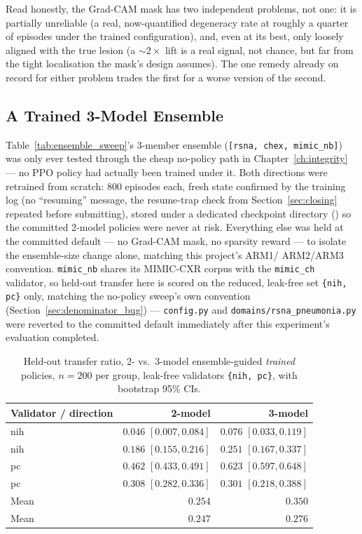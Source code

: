 Read honestly, the Grad-CAM mask has two independent problems, not one:
it is partially unreliable (a real, now-quantified degeneracy rate at
roughly a quarter of episodes under the trained configuration), and, even
at its best, only loosely aligned with the true lesion (a $\sim2\times$
lift is a real signal, not chance, but far from the tight localisation the
mask's design assumes). The one remedy already on record for either
problem trades the first for a worse version of the second.

\subsection{A Trained 3-Model Ensemble}
\label{sec:ensemble3}

Table~\ref{tab:ensemble_sweep}'s 3-member ensemble
(\texttt{[rsna, chex, mimic\_nb]}) was only ever tested through the cheap
no-policy path in Chapter~\ref{ch:integrity} --- no PPO policy had
actually been trained under it. Both directions were retrained from
scratch: 800 episodes each, fresh state confirmed by the training log
(no ``resuming'' message, the resume-trap check from
Section~\ref{sec:closing} repeated before submitting), stored under a
dedicated checkpoint directory () so the
committed 2-model policies were never at risk. Everything else was held
at the committed default --- no Grad-CAM mask, no sparsity reward --- to
isolate the ensemble-size change alone, matching this project's ARM1/
ARM2/ARM3 convention. \texttt{mimic\_nb} shares its MIMIC-CXR corpus with
the \texttt{mimic\_ch} validator, so held-out transfer here is scored on
the reduced, leak-free set \texttt{\{nih, pc\}} only, matching the
no-policy sweep's own convention (Section~\ref{sec:denominator_bug}) ---
\texttt{config.py} and \texttt{domains/rsna\_pneumonia.py} were reverted
to the committed default immediately after this experiment's evaluation
completed.

\begin{table}[h]
\centering
\caption{Held-out transfer ratio, 2- vs.\ 3-model ensemble-guided
\emph{trained} policies, $n=200$ per group, leak-free validators
\texttt{\{nih, pc\}}, with bootstrap 95\% CIs.}
\label{tab:ensemble3_transfer}
\begin{tabular}{@{}lrr@{}}
\toprule
\textbf{Validator / direction} & \textbf{2-model} & \textbf{3-model} \\
\midrule
nih \ntop{} & $0.046$ $[0.007,0.084]$ & $0.076$ $[0.033,0.119]$ \\
nih \pton{} & $0.186$ $[0.155,0.216]$ & $0.251$ $[0.167,0.337]$ \\
pc \ntop{}  & $0.462$ $[0.433,0.491]$ & $\mathbf{0.623}$ $[0.597,0.648]$ \\
pc \pton{}  & $0.308$ $[0.282,0.336]$ & $0.301$ $[0.218,0.388]$ \\
\midrule
Mean \ntop{} & $0.254$ & $\mathbf{0.350}$ \\
Mean \pton{} & $0.247$ & $\mathbf{0.276}$ \\
\bottomrule
\end{tabular}
\end{table}

